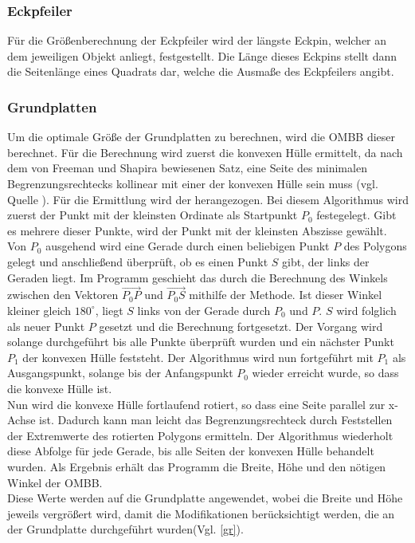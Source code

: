 \subsubsection{Eckpfeiler}
Für die Größenberechnung der Eckpfeiler wird der längste Eckpin, welcher an dem jeweiligen Objekt anliegt, festgestellt.
Die Länge dieses Eckpins stellt dann die Seitenlänge eines Quadrats dar, welche die Ausmaße des Eckpfeilers angibt.

\subsubsection{Grundplatten}
Um die optimale Größe der Grundplatten zu berechnen, wird die OMBB dieser berechnet.
Für die Berechnung wird zuerst die konvexen Hülle ermittelt, da nach dem von Freeman und Shapira bewiesenen Satz, eine Seite des minimalen Begrenzungsrechtecks kollinear mit einer der konvexen Hülle sein muss (vgl. Quelle \cite{ombb}).
Für die Ermittlung wird der  herangezogen.
Bei diesem Algorithmus wird zuerst der Punkt mit der kleinsten Ordinate als Startpunkt $P_0$ festegelegt.
Gibt es mehrere dieser Punkte, wird der Punkt mit der kleinsten Abszisse gewählt.
Von $P_0$ ausgehend wird eine Gerade durch einen beliebigen Punkt $P$ des Polygons gelegt und anschließend überprüft, ob es einen Punkt $S$ gibt, der links der Geraden liegt.
Im Programm geschieht das durch die Berechnung des Winkels zwischen den Vektoren $\overrightarrow{{P_0}P}$ und $\overrightarrow{{P_0}S}$ mithilfe der  Methode.
Ist dieser Winkel kleiner gleich $180^\circ$, liegt $S$ links von der Gerade durch $P_0$ und $P$.
$S$ wird folglich als neuer Punkt $P$ gesetzt und die Berechnung fortgesetzt.
Der Vorgang wird solange durchgeführt bis alle Punkte überprüft wurden und ein nächster Punkt $P_1$ der konvexen Hülle feststeht.
Der Algorithmus wird nun fortgeführt mit $P_1$ als Ausgangspunkt, solange bis der Anfangspunkt $P_0$ wieder erreicht wurde, so dass die konvexe Hülle  ist.\\
Nun wird die konvexe Hülle fortlaufend rotiert, so dass eine Seite parallel zur x-Achse ist.
Dadurch kann man leicht das Begrenzungsrechteck durch Feststellen der Extremwerte des rotierten Polygons ermitteln.
Der Algorithmus wiederholt diese Abfolge für jede Gerade, bis alle Seiten der konvexen Hülle behandelt wurden.
Als Ergebnis erhält das Programm die Breite, Höhe und den nötigen Winkel der OMBB.\\
Diese Werte werden auf die Grundplatte angewendet, wobei die Breite und Höhe jeweils vergrößert wird, damit die Modifikationen berücksichtigt werden, die an der Grundplatte durchgeführt wurden(Vgl. \ref{gr}).